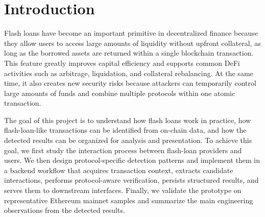 \section{Introduction}

Flash loans have become an important primitive in decentralized finance because they allow users to access large amounts of liquidity without upfront collateral, as long as the borrowed assets are returned within a single blockchain transaction. This feature greatly improves capital efficiency and supports common DeFi activities such as arbitrage, liquidation, and collateral rebalancing. At the same time, it also creates new security risks because attackers can temporarily control large amounts of funds and combine multiple protocols within one atomic transaction.

The goal of this project is to understand how flash loans work in practice, how flash-loan-like transactions can be identified from on-chain data, and how the detected results can be organized for analysis and presentation. To achieve this goal, we first study the interaction process between flash-loan providers and users. We then design protocol-specific detection patterns and implement them in a backend workflow that acquires transaction context, extracts candidate interactions, performs protocol-aware verification, persists structured results, and serves them to downstream interfaces. Finally, we validate the prototype on representative Ethereum mainnet samples and summarize the main engineering observations from the detected results.
